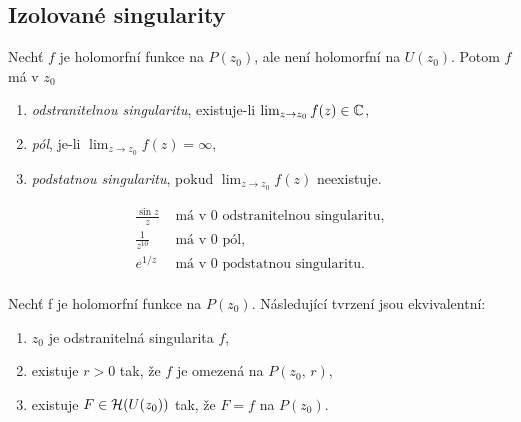 \subsection{Izolované singularity}
\begin{definition}
Nechť $f$ je holomorfní funkce na $P(z_0)$, ale není holomorfní na $U(z_0)$. Potom $f$ má v $z_0$
\begin{enumerate}
    \item \emph{odstranitelnou singularitu}, existuje-li $\lim_{z\rightarrow z_0}f(z)\in\operatorname{\mathbb{C}}$,
    \item \emph{pól}, je-li $\lim_{z\rightarrow z_0}f(z)=\infty$,
    \item \emph{podstatnou singularitu}, pokud $\lim_{z\rightarrow z_0}f(z)$ neexistuje.
\end{enumerate}
\end{definition}
\begin{example}
\begin{align*}
     \frac{\sin{z}}{z}& \text{ má v 0 odstranitelnou singularitu,}\\
     \frac{1}{z^{10}}& \text{ má v 0 pól,}\\
     e^{1/z}& \text{ má v 0 podstatnou singularitu.}\\
\end{align*}
\end{example}
\begin{theorem} Nechť f je holomorfní funkce na $P(z_0)$. Následující tvrzení jsou ekvivalentní:
\begin{enumerate}
    \item $z_0$ je odstranitelná singularita $f$,
    \item existuje $r>0$ tak, že $f$ je omezená na $P(z_0,\, r)$,
    \item existuje $F\in \operatorname{\mathcal{H}} (U(z_0))$ tak, že $F=f$ na $P(z_0)$.
\end{enumerate}
\end{theorem}

